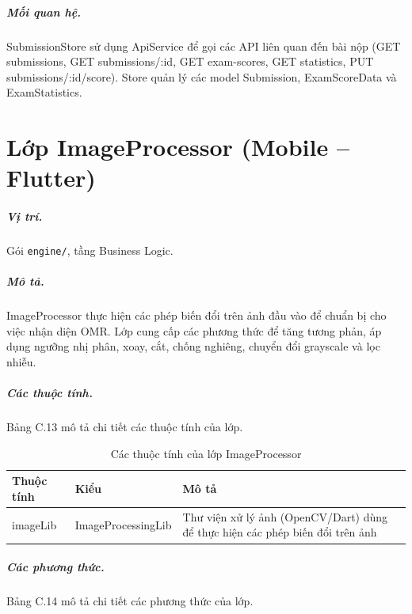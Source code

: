 \documentclass[../DoAn.tex]{subfiles}
\begin{document}
\subparagraph{Mối quan hệ.} SubmissionStore sử dụng ApiService để gọi các API liên quan đến bài nộp (GET submissions, GET submissions/:id, GET exam-scores, GET statistics, PUT submissions/:id/score). Store quản lý các model Submission, ExamScoreData và ExamStatistics.

\vspace{0.3cm}

\section{Lớp ImageProcessor (Mobile -- Flutter)}
\label{appendix:image_processor}

\subparagraph{Vị trí.} Gói \texttt{engine/}, tầng Business Logic.

\subparagraph{Mô tả.} ImageProcessor thực hiện các phép biến đổi trên ảnh đầu vào để chuẩn bị cho việc nhận diện OMR. Lớp cung cấp các phương thức để tăng tương phản, áp dụng ngưỡng nhị phân, xoay, cắt, chống nghiêng, chuyển đổi grayscale và lọc nhiễu.

\subparagraph{Các thuộc tính.} Bảng C.13 mô tả chi tiết các thuộc tính của lớp.

\begin{table}[H]
\centering
\begin{tabular}{|p{4cm}|p{3.5cm}|p{5cm}|}
\hline
\textbf{Thuộc tính} & \textbf{Kiểu} & \textbf{Mô tả} \\ \hline
imageLib & ImageProcessingLib & Thư viện xử lý ảnh (OpenCV/Dart) dùng để thực hiện các phép biến đổi trên ảnh \\ \hline
\end{tabular}
\caption{Các thuộc tính của lớp ImageProcessor}
\label{table:image_processor_attrs}
\end{table}

\subparagraph{Các phương thức.} Bảng C.14 mô tả chi tiết các phương thức của lớp.
\end{document}
